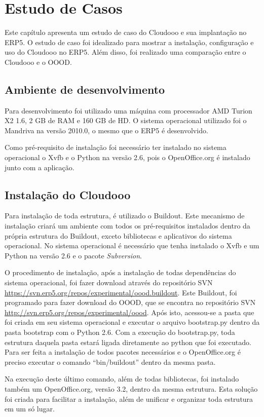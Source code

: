 \chapter{Estudo de Casos}
\label{cap5}
Este capítulo apresenta um estudo de caso do Cloudooo e sua implantação no ERP5. O estudo de caso foi idealizado para mostrar a instalação, configuração e uso do Cloudooo no ERP5. Além disso, foi realizado uma comparação entre o Cloudooo e o OOOD.

\section{Ambiente de desenvolvimento}
Para desenvolvimento foi utilizado uma máquina com processador AMD Turion X2 1.6, 2 GB de RAM e 160 GB de HD. O sistema operacional utilizado foi o Mandriva na versão 2010.0, o mesmo que o ERP5 é desenvolvido.

Como pré-requisito de instalação foi necessário ter instalado no sistema operacional o Xvfb e o Python na versão 2.6, pois o OpenOffice.org é instalado junto com a aplicação.

\section{Instalação do Cloudooo}
Para instalação de toda estrutura, é utilizado o Buildout. Este mecanismo de instalação criará um ambiente com todos os pré-requisitos instalados dentro da própria estrutura do Buildout, exceto bibliotecas e aplicativos do sistema operacional. No sistema operacional é necessário que tenha instalado o Xvfb e um Python na versão 2.6 e o pacote \textit{Subversion}.

O procedimento de instalação, após a instalação de todas dependências do sistema operacional, foi fazer download através do repositório SVN \url{https://svn.erp5.org/repos/experimental/oood.buildout}. Este Buildout, foi programado para fazer download do OOOD, que se encontra no repositório SVN \url{http://svn.erp5.org/repos/experimental/oood}. Após isto, acessou-se a pasta que foi criada em seu sistema operacional e executar o arquivo bootstrap.py dentro da pasta bootstrap com o Python 2.6. Com a execução do bootstrap.py, toda estrutura daquela pasta estará ligada diretamente ao python que foi executado. Para ser feita a instalação de todos pacotes necessários e o OpenOffice.org é preciso executar o comando ``bin/buildout'' dentro da mesma pasta.

Na execução deste último comando, além de todas bibliotecas, foi instalado também um OpenOffice.org, versão 3.2, dentro da mesma estrutura. Esta solução foi criada para facilitar a instalação, além de unificar e organizar toda estrutura em um só lugar.

